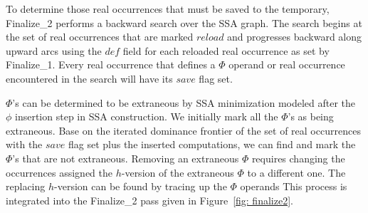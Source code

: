 To determine those real occurrences that must be saved to the temporary,
Finalize\_2 performs a backward search over the SSA graph.  The search
begins at the set of real occurrences that are marked $reload$ and progresses
backward along upward arcs using the $def$ field for each reloaded real
occurrence as set by Finalize\_1.  Every real occurrence that defines a
$\Phi$ operand or real occurrence encountered in the search will have its
$save$ flag set.

$\Phi$'s can be determined to be extraneous by SSA minimization modeled
after the $\phi$ insertion step in SSA construction. We initially mark
all the $\Phi$'s as being extraneous.  Base on the iterated dominance
frontier of the set of real occurrences with the $save$ flag set plus
the inserted computations, we can find and mark the $\Phi$'s that are not
extraneous.
Removing an extraneous $\Phi$ requires changing the occurrences assigned
the $h$-version of the extraneous $\Phi$ to a different one.  The replacing
$h$-version can be found by tracing up the $\Phi$ operands  This process
is integrated into the Finalize\_2 pass given in Figure~\ref{fig: finalize2}.


